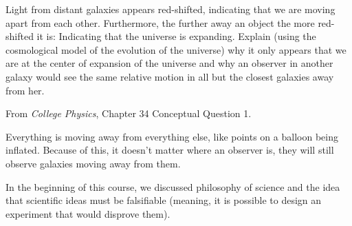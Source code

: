 \documentclass[12pt]{exam}
\begin{document}
\begin{questions}
\question Light from distant galaxies appears red-shifted, indicating that we are moving apart from each other. Furthermore, the further away an object the more red-shifted it is: Indicating that the universe is expanding. Explain (using the cosmological model of the evolution of the universe) why it only appears that we are at the center of expansion of the universe and why an observer in another galaxy would see the same relative motion in all but the closest galaxies away from her.

From \textit{College Physics}, Chapter 34 Conceptual Question 1.
\begin{TheSolution}
	Everything is moving away from everything else, like points on a balloon being inflated. Because of this, it doesn't matter where an observer is, they will still observe galaxies moving away from them.
\end{TheSolution}

\question In the beginning of this course, we discussed philosophy of science and the idea that scientific ideas must be falsifiable (meaning, it is possible to design an experiment that would disprove them). 

\end{questions}
\end{document}
